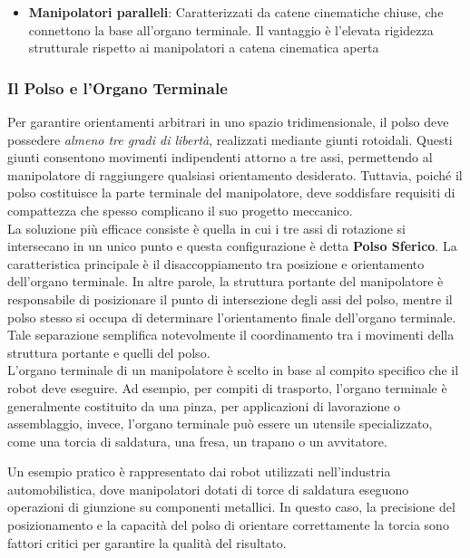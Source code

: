 ﻿\documentclass[11pt, a4paper]{article}
\begin{document}
\begin{itemize}
	\item \textbf{Manipolatori paralleli}: Caratterizzati da catene cinematiche chiuse, che connettono la base all'organo terminale. Il vantaggio è l'elevata rigidezza strutturale rispetto ai manipolatori a catena cinematica aperta
\end{itemize}

\subsubsection{Il Polso e l'Organo Terminale}
Per garantire orientamenti arbitrari in uno spazio tridimensionale, il polso deve possedere \textit{almeno tre gradi di libertà}, realizzati mediante giunti rotoidali. Questi giunti consentono movimenti indipendenti attorno a tre assi, permettendo al manipolatore di raggiungere qualsiasi orientamento desiderato. Tuttavia, poiché il polso costituisce la parte terminale del manipolatore, deve soddisfare requisiti di compattezza che spesso complicano il suo progetto meccanico.\\
La soluzione più efficace consiste è quella in cui i tre assi di rotazione si intersecano in un unico punto e questa configurazione è detta \textbf{Polso Sferico}. La caratteristica principale è il disaccoppiamento tra posizione e orientamento dell'organo terminale. In altre parole, la struttura portante del manipolatore è responsabile di posizionare il punto di intersezione degli assi del polso, mentre il polso stesso si occupa di determinare l'orientamento finale dell'organo terminale. Tale separazione semplifica notevolmente il coordinamento tra i movimenti della struttura portante e quelli del polso.\\
L'organo terminale di un manipolatore è scelto in base al compito specifico che il robot deve eseguire. Ad esempio, per compiti di trasporto, l'organo terminale è generalmente costituito da una pinza, per applicazioni di lavorazione o assemblaggio, invece, l'organo terminale può essere un utensile specializzato, come una torcia di saldatura, una fresa, un trapano o un avvitatore.

Un esempio pratico è rappresentato dai robot utilizzati nell'industria automobilistica, dove manipolatori dotati di torce di saldatura eseguono operazioni di giunzione su componenti metallici. In questo caso, la precisione del posizionamento e la capacità del polso di orientare correttamente la torcia sono fattori critici per garantire la qualità del risultato.
\end{document}
